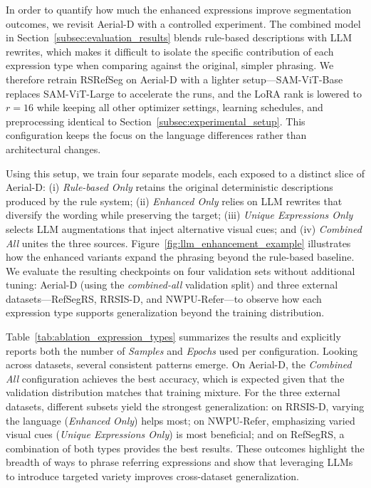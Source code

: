 In order to quantify how much the enhanced expressions improve segmentation outcomes, we revisit Aerial-D with a controlled experiment. The combined model in Section~\ref{subsec:evaluation_results} blends rule-based descriptions with LLM rewrites, which makes it difficult to isolate the specific contribution of each expression type when comparing against the original, simpler phrasing. We therefore retrain RSRefSeg on Aerial-D with a lighter setup—SAM-ViT-Base replaces SAM-ViT-Large to accelerate the runs, and the LoRA rank is lowered to \(r=16\) while keeping all other optimizer settings, learning schedules, and preprocessing identical to Section~\ref{subsec:experimental_setup}. This configuration keeps the focus on the language differences rather than architectural changes.

Using this setup, we train four separate models, each exposed to a distinct slice of Aerial-D: (i) \emph{Rule-based Only} retains the original deterministic descriptions produced by the rule system; (ii) \emph{Enhanced Only} relies on LLM rewrites that diversify the wording while preserving the target; (iii) \emph{Unique Expressions Only} selects LLM augmentations that inject alternative visual cues; and (iv) \emph{Combined All} unites the three sources. Figure~\ref{fig:llm_enhancement_example} illustrates how the enhanced variants expand the phrasing beyond the rule-based baseline. We evaluate the resulting checkpoints on four validation sets without additional tuning: Aerial-D (using the \emph{combined-all} validation split) and three external datasets—RefSegRS, RRSIS-D, and NWPU-Refer—to observe how each expression type supports generalization beyond the training distribution.

Table~\ref{tab:ablation_expression_types} summarizes the results and explicitly reports both the number of \emph{Samples} and \emph{Epochs} used per configuration. Looking across datasets, several consistent patterns emerge. On Aerial-D, the \emph{Combined All} configuration achieves the best accuracy, which is expected given that the validation distribution matches that training mixture. For the three external datasets, different subsets yield the strongest generalization: on RRSIS-D, varying the language (\emph{Enhanced Only}) helps most; on NWPU-Refer, emphasizing varied visual cues (\emph{Unique Expressions Only}) is most beneficial; and on RefSegRS, a combination of both types provides the best results. These outcomes highlight the breadth of ways to phrase referring expressions and show that leveraging LLMs to introduce targeted variety improves cross-dataset generalization.

